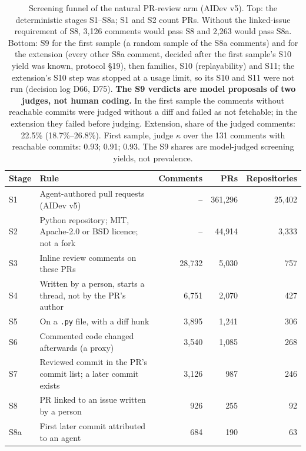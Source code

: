 \begin{table}[t]\centering\footnotesize
\caption{Screening funnel of the natural PR-review arm (AIDev v5). Top: the deterministic stages S1--S8a; S1 and S2 count PRs. Without the linked-issue requirement of S8, 3{,}126 comments would pass S8 and 2{,}263 would pass S8a. Bottom: S9 for the first sample (a random sample of the S8a comments) and for the extension (every other S8a comment, decided after the first sample's S10 yield was known, protocol \S19), then families, S10 (replayability) and S11; the extension's S10 step was stopped at a usage limit, so its S10 and S11 were not run (decision log D66, D75). \textbf{The S9 verdicts are model proposals of two judges, not human coding.} In the first sample the comments without reachable commits were judged without a diff and failed as not fetchable; in the extension they failed before judging. Extension, share of the judged comments: 22.5\% (18.7\%--26.8\%). First sample, judge $\kappa$ over the 131 comments with reachable commits: 0.93; 0.91; 0.93. The S9 shares are model-judged screening yields, not prevalence.}\label{tab:natural-funnel}
\begin{tabular}{llrrr}\toprule Stage & Rule & Comments & PRs & Repositories \\\midrule
S1 & Agent-authored pull requests (AIDev v5) & -- & 361{,}296 & 25{,}402 \\
S2 & Python repository; MIT, Apache-2.0 or BSD licence; not a fork & -- & 44{,}914 & 3{,}333 \\
S3 & Inline review comments on these PRs & 28{,}732 & 5{,}030 & 757 \\
S4 & Written by a person, starts a thread, not by the PR's author & 6{,}751 & 2{,}070 & 427 \\
S5 & On a \texttt{.py} file, with a diff hunk & 3{,}895 & 1{,}241 & 306 \\
S6 & Commented code changed afterwards (a proxy) & 3{,}540 & 1{,}085 & 268 \\
S7 & Reviewed commit in the PR's commit list; a later commit exists & 3{,}126 & 987 & 246 \\
S8 & PR linked to an issue written by a person & 926 & 255 & 92 \\
S8a & First later commit attributed to an agent & 684 & 190 & 63 \\
\bottomrule\end{tabular}


\end{table}
